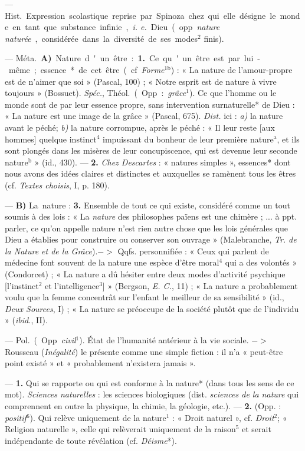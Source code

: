 \begin{itemize}[leftmargin=1cm, label=, itemsep=1pt]
 — \si{Hist.} Expression scolastique reprise par
Spinoza chez qui elle désigne le monde en tant que substance infinie, {\it i.
e.} Dieu (opp. {\it nature naturée}, considérée dans la diversité de ses
modes$^2$ finis).

 — \si{Méta.} {\bf A)} \si{Nature d'un être} : {\bf 1.} Ce qu'un
être est par lui-même ; essence* de cet être (cf. {\it Forme}$^\text{1b}$) :
« La nature de l’amour-propre est de n’aimer que soi » (Pascal, 100) ;
« Notre esprit est de nature à vivre toujours » (Bossuet). {\it Spéc.},
\si{Théol.} (Opp. : {\it grâce}$^1$). Ce que l’homme ou le monde sont de par
leur essence propre, sans intervention surnaturelle* de Dieu : « La nature
est une image de la grâce » (Pascal, 675). {\it Dist.} ici : {\it a)} la
nature avant le péché; {\it b)} la nature corrompue, après le péché : « Il
leur reste [aux hommes] quelque instinct$^4$ impuissant du bonheur de leur
première nature$^\text{a}$, et ils sont plongés dans les misères de leur
concupiscence, qui est devenue leur seconde nature$^\text{b}$ » (id., 430). —
{\bf 2.} {\it Chez Descartes} : « natures simples », essences* dont nous
avons des idées claires et distinctes et auxquelles se ramènent tous les
êtres (cf. {\it Textes choisis}, I, p. 180).

— {\bf B)} \si{La nature} : {\bf 3.} Ensemble de tout ce qui existe,
considéré comme un tout soumis à des lois : « La {\it nature} des philosophes
païens est une chimère ; ... à ppt. parler, ce qu’on appelle nature n’est
rien autre chose que les lois générales que Dieu a établies pour construire
ou conserver son ouvrage » (Malebranche, {\it Tr. de la Nature et de la
Grâce}).$->$ Qqfs. personnifiée : « Ceux qui parlent de médecine font souvent
de la nature une espèce d'être moral$^4$ qui a des volontés » (Condorcet) ;
« La nature a dû hésiter entre deux modes d'activité psychique [l’instinct$^2$
et l'intelligence$^3$] » (Bergson, {\it E. C.}, 11) ; « La nature a
probablement voulu que la femme concentrât sur l'enfant le meilleur de sa
sensibilité » (id., {\it Deux Sources}, I) ; « La nature se préoccupe de la
société plutôt que de l'individu » ({\it ibid.}, II).

 — \si{Pol.} (Opp. {\it civil}$^1$). État de l'humanité
antérieur à la vie sociale. $->$ Rousseau ({\it Inégalité}) le présente comme
une simple fiction : il n'a « peut-être point existé » et « probablement
n’existera jamais ».

 — {\bf 1.} Qui se rapporte ou qui est conforme à la nature*
(dans tous les sens de ce mot). {\it Sciences naturelles} : les sciences
biologiques (dist. {\it sciences de la nature} qui comprennent en outre la
physique, la chimie, la géologie, etc.). — {\bf 2.} (Opp. :
{\it positif}$^6$). Qui relève uniquement de la nature$^1$ : « Droit
naturel », cf. {\it Droit}$^2$; « Religion naturelle », celle qui relèverait
uniquement de la raison$^5$ et serait indépendante de toute révélation (cf.
{\it Déisme}*).


\end{itemize}
